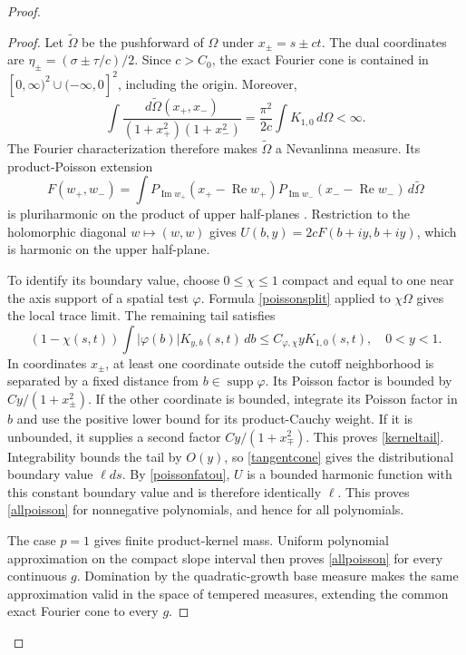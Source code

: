 \documentclass[11pt]{article}
\newcommand{\supp}{\operatorname{supp}}
\begin{document}
\begin{proof}
\begin{proof}
Let $\widetilde\Omega$ be the pushforward of $\Omega$ under $x_\pm=s\pm ct$. The dual coordinates are $\eta_\pm=(\sigma\pm\tau/c)/2$. Since $c>C_0$, the exact Fourier cone is contained in $[0,\infty)^2\cup(-\infty,0]^2$, including the origin. Moreover,
\[
 \int\frac{d\widetilde\Omega(x_+,x_-)}{(1+x_+^2)(1+x_-^2)}
 =\frac{\pi^2}{2c}\int K_{1,0}\,d\Omega<\infty.
\]
The Fourier characterization \cite[Theorem 3.2]{NS} therefore makes $\widetilde\Omega$ a Nevanlinna measure. Its product-Poisson extension
\[
 F(w_+,w_-)=\int P_{\operatorname{Im}w_+}(x_+-\operatorname{Re}w_+)
 P_{\operatorname{Im}w_-}(x_--\operatorname{Re}w_-)\,d\widetilde\Omega
\]
is pluriharmonic on the product of upper half-planes \cite[Section 2.1]{NS}. Restriction to the holomorphic diagonal $w\mapsto(w,w)$ gives $U(b,y)=2cF(b+iy,b+iy)$, which is harmonic on the upper half-plane.

To identify its boundary value, choose $0\le\chi\le1$ compact and equal to one near the axis support of a spatial test $\varphi$. Formula \eqref{poissonsplit} applied to $\chi\Omega$ gives the local trace limit. The remaining tail satisfies
\begin{equation}\label{kerneltail}
 (1-\chi(s,t))\int |\varphi(b)|K_{y,b}(s,t)\,db
 \le C_{\varphi,\chi}y K_{1,0}(s,t),\quad 0<y<1.
\end{equation}
In coordinates $x_\pm$, at least one coordinate outside the cutoff neighborhood is separated by a fixed distance from $b\in\supp\varphi$. Its Poisson factor is bounded by $Cy/(1+x_\pm^2)$. If the other coordinate is bounded, integrate its Poisson factor in $b$ and use the positive lower bound for its product-Cauchy weight. If it is unbounded, it supplies a second factor $Cy/(1+x_\mp^2)$. This proves \eqref{kerneltail}. Integrability bounds the tail by $O(y)$, so \eqref{tangentcone} gives the distributional boundary value $\ell ds$. By \eqref{poissonfatou}, $U$ is a bounded harmonic function with this constant boundary value and is therefore identically $\ell$. This proves \eqref{allpoisson} for nonnegative polynomials, and hence for all polynomials.

The case $p=1$ gives finite product-kernel mass. Uniform polynomial approximation on the compact slope interval then proves \eqref{allpoisson} for every continuous $g$. Domination by the quadratic-growth base measure makes the same approximation valid in the space of tempered measures, extending the common exact Fourier cone to every $g$.
\end{proof}


\end{proof}
\end{document}
